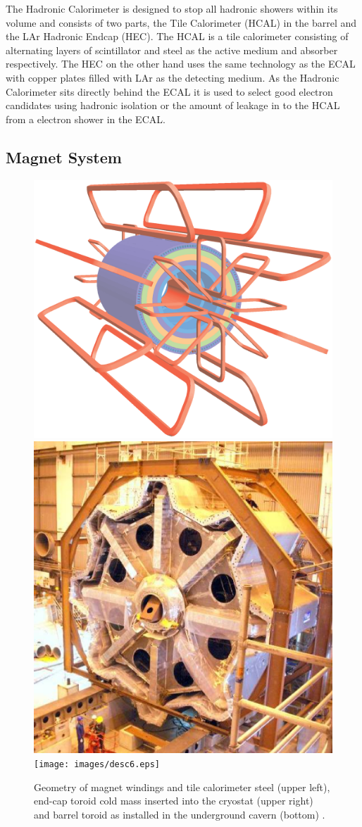 		The Hadronic Calorimeter is designed to stop all hadronic showers within its volume and consists of two parts, the Tile Calorimeter (HCAL) in the barrel and the LAr Hadronic Endcap (HEC). The HCAL is a tile calorimeter consisting of alternating layers of scintillator and steel as the active medium and absorber respectively. The HEC on the other hand uses the same technology as the ECAL with copper plates filled with LAr as the detecting medium. As the Hadronic Calorimeter sits directly behind the ECAL it is used to select good electron candidates using hadronic isolation or the amount of leakage in to the HCAL from a electron shower in the ECAL.
		


	\subsection{Magnet System}

		\begin{figure}[h!]
			\begin{center}
				\includegraphics[width=0.48\linewidth]{images/ATLcoilGeom.eps}
				\includegraphics[width=0.48\linewidth]{images/desc5.eps}\\
				\texttt{[image: images/desc6.eps]}
			\end{center}
			\caption{Geometry of magnet windings and tile calorimeter steel (upper left), end-cap toroid cold mass inserted into the cryostat (upper right) and barrel toroid as installed in the underground cavern (bottom) \cite{Aad:1129811}.}
			\label{fig:ATLAS_magnet}
		\end{figure}

